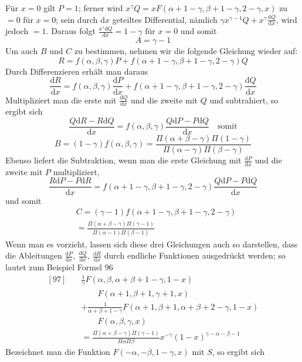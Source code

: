 Für \(x=0\) gilt \(P=1\); ferner wird \(x^\gamma Q=xF(\alpha+1-\gamma,\beta+1-\gamma,2-\gamma,x)\) zu \(=0\) für \(x=0\); sein durch \(\mathrm dx\) geteiltes Differential, nämlich \(\gamma x^{\gamma-1}Q+x^\gamma\frac{\mathrm dQ}{\mathrm dx}\), wird jedoch \(=1\). Daraus folgt \(\frac{x^\gamma\mathrm dQ}{\mathrm dx}=1-\gamma\) für \(x=0\) und somit
\[
A=\gamma-1
\]
Um auch \(B\) und \(C\) zu bestimmen, nehmen wir die folgende Gleichung wieder auf:
\[
R=f(\alpha,\beta,\gamma)P+f(\alpha+1-\gamma,\beta+1-\gamma,2-\gamma)Q
\]
Durch Differenzieren erhält man daraus
\[
\frac{\mathrm dR}{\mathrm dx}=f(\alpha,\beta,\gamma)\frac{\mathrm dP}{\mathrm dx}+f(\alpha+1-\gamma,\beta+1-\gamma,2-\gamma)\frac{\mathrm dQ}{\mathrm dx}
\]
Multipliziert man die erste mit \(\frac{\mathrm dQ}{\mathrm dx}\) und die zweite mit \(Q\) und subtrahiert, so ergibt sich
\[
\frac{Q\mathrm dR-R\mathrm dQ}{\mathrm dx}=f(\alpha,\beta,\gamma)\frac{Q\mathrm dP-P\mathrm dQ}{\mathrm dx}\quad\mbox{somit}
\]
\[
B=(1-\gamma)f(\alpha,\beta,\gamma)=\frac{\Pi(\alpha+\beta-\gamma)\Pi(1-\gamma)}{\Pi(\alpha-\gamma)\Pi(\beta-\gamma)}
\]
Ebenso liefert die Subtraktion, wenn man die erste Gleichung mit \(\frac{\mathrm dP}{\mathrm dx}\) und die zweite mit \(P\) multipliziert,
\[
\frac{R\mathrm dP-P\mathrm dR}{\mathrm dx}=f(\alpha+1-\gamma,\beta+1-\gamma,2-\gamma)\frac{Q\mathrm dP-P\mathrm dQ}{\mathrm dx}
\]
und somit
\[
\begin{aligned}&C=(\gamma-1)f(\alpha+1-\gamma,\beta+1-\gamma,2-\gamma)\\&=\frac{\Pi(\alpha+\beta-\gamma)\Pi(\gamma-1)}{\Pi(\alpha-1)\Pi(\beta-1)}\end{aligned}
\]
Wenn man es vorzieht, lassen sich diese drei Gleichungen auch so darstellen, dass die Ableitungen \(\frac{\mathrm dP}{\mathrm dx},\ \frac{\mathrm dQ}{\mathrm dx},\ \frac{\mathrm dR}{\mathrm dx}\) durch endliche Funktionen ausgedrückt werden; so lautet zum Beispiel Formel 96
\[
\begin{aligned}
{}[97]\quad&\frac1\gamma F(\alpha,\beta,\alpha+\beta+1-\gamma,1-x)\\&\qquad F(\alpha+1,\beta+1,\gamma+1,x)\\
&+\frac1{\alpha+\beta+1-\gamma}F(\alpha+1,\beta+1,\alpha+\beta+2-\gamma,1-x)\\&\qquad F(\alpha,\beta,\gamma,x)\\
&=\frac{\Pi(\alpha+\beta-\gamma)\Pi(\gamma-1)}{\Pi\alpha\Pi\beta}x^{-\gamma}(1-x)^{\gamma-\alpha-\beta-1}
\end{aligned}
\]
Bezeichnet man die Funktion $F(-\alpha,-\beta,1-\gamma,x)$ mit $S$, so ergibt sich
